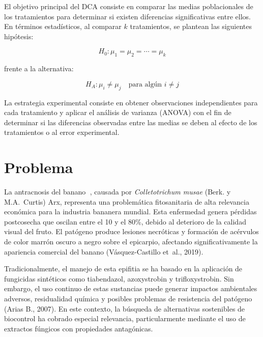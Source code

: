 \documentclass[
  spanish,
  letterpaper,
  DIV=11,
  numbers=noendperiod]{scrreprt}
\begin{document}
El objetivo principal del DCA consiste en comparar las medias
poblacionales de los tratamientos para determinar si existen diferencias
significativas entre ellos. En términos estadísticos, al comparar \(k\)
tratamientos, se plantean las siguientes hipótesis:

\[
H_0: \mu_1 = \mu_2 = \cdots = \mu_k
\]

frente a la alternativa:

\[
H_A: \mu_i \ne \mu_j \quad \text{para algún } i \ne j
\]

La estrategia experimental consiste en obtener observaciones
independientes para cada tratamiento y aplicar el análisis de varianza
(ANOVA) con el fin de determinar si las diferencias observadas entre las
medias se deben al efecto de los tratamientos o al error experimental.

\section{Problema}\label{problema}

\begin{tcolorbox}[enhanced jigsaw, colback=white, breakable, toptitle=1mm, toprule=.15mm, colbacktitle=quarto-callout-note-color!10!white, bottomrule=.15mm, coltitle=black, titlerule=0mm, opacityback=0, leftrule=.75mm, bottomtitle=1mm, colframe=quarto-callout-note-color-frame, left=2mm, title=\textcolor{quarto-callout-note-color}{\faInfo}\hspace{0.5em}{Nota}, rightrule=.15mm, opacitybacktitle=0.6, arc=.35mm]

La antracnosis del banano 🍌, causada por \emph{Colletotrichum musae}
(Berk. y M.A.~Curtis) Arx, representa una problemática fitosanitaria de
alta relevancia económica para la industria bananera mundial. Esta
enfermedad genera pérdidas postcosecha que oscilan entre el 10 y el
80\%, debido al deterioro de la calidad visual del fruto. El patógeno
produce lesiones necróticas y formación de acérvulos de color marrón
oscuro a negro sobre el epicarpio, afectando significativamente la
apariencia comercial del banano (Vásquez-Castillo et~al., 2019).

Tradicionalmente, el manejo de esta epifitia se ha basado en la
aplicación de fungicidas sintéticos como tiabendazol, azoxystrobin y
trifloxystrobin. Sin embargo, el uso continuo de estas sustancias puede
generar impactos ambientales adversos, residualidad química y posibles
problemas de resistencia del patógeno (Arias B., 2007). En este
contexto, la búsqueda de alternativas sostenibles de biocontrol ha
cobrado especial relevancia, particularmente mediante el uso de
extractos fúngicos con propiedades antagónicas.

\end{tcolorbox}
\end{document}

